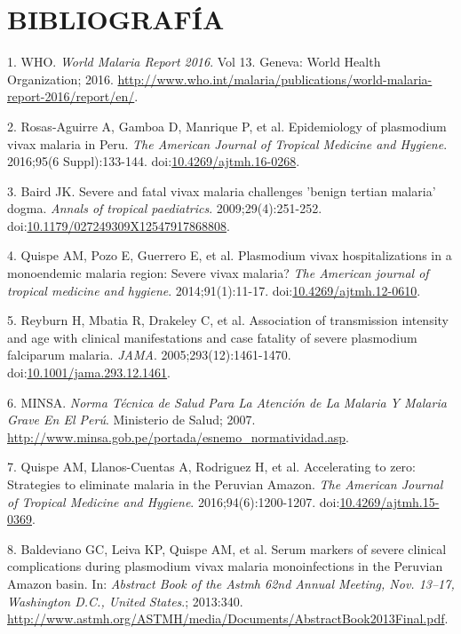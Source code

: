 \documentclass[a4paper]{article}
\begin{document}
\section{BIBLIOGRAFÍA}\label{bibliografia}

\hypertarget{refs}{}
\hypertarget{ref-WHO2016world}{}
1. WHO. \emph{World Malaria Report 2016}. Vol 13. Geneva: World Health
Organization; 2016.
\url{http://www.who.int/malaria/publications/world-malaria-report-2016/report/en/}.

\hypertarget{ref-rosas2016peru}{}
2. Rosas-Aguirre A, Gamboa D, Manrique P, et al. Epidemiology of
plasmodium vivax malaria in Peru. \emph{The American Journal of Tropical
Medicine and Hygiene}. 2016;95(6 Suppl):133-144.
doi:\href{https://doi.org/10.4269/ajtmh.16-0268}{10.4269/ajtmh.16-0268}.

\hypertarget{ref-baird2009}{}
3. Baird JK. Severe and fatal vivax malaria challenges 'benign tertian
malaria' dogma. \emph{Annals of tropical paediatrics}.
2009;29(4):251-252.
doi:\href{https://doi.org/10.1179/027249309X12547917868808}{10.1179/027249309X12547917868808}.

\hypertarget{ref-quispe2014}{}
4. Quispe AM, Pozo E, Guerrero E, et al. Plasmodium vivax
hospitalizations in a monoendemic malaria region: Severe vivax malaria?
\emph{The American journal of tropical medicine and hygiene}.
2014;91(1):11-17.
doi:\href{https://doi.org/10.4269/ajtmh.12-0610}{10.4269/ajtmh.12-0610}.

\hypertarget{ref-reyburn2015}{}
5. Reyburn H, Mbatia R, Drakeley C, et al. Association of transmission
intensity and age with clinical manifestations and case fatality of
severe plasmodium falciparum malaria. \emph{JAMA}.
2005;293(12):1461-1470.
doi:\href{https://doi.org/10.1001/jama.293.12.1461}{10.1001/jama.293.12.1461}.

\hypertarget{ref-norma2001}{}
6. MINSA. \emph{Norma Técnica de Salud Para La Atención de La Malaria Y
Malaria Grave En El Perú}. Ministerio de Salud; 2007.
\url{http://www.minsa.gob.pe/portada/esnemo_normatividad.asp}.

\hypertarget{ref-accelerate2016}{}
7. Quispe AM, Llanos-Cuentas A, Rodriguez H, et al. Accelerating to
zero: Strategies to eliminate malaria in the Peruvian Amazon. \emph{The
American Journal of Tropical Medicine and Hygiene}.
2016;94(6):1200-1207.
doi:\href{https://doi.org/10.4269/ajtmh.15-0369}{10.4269/ajtmh.15-0369}.

\hypertarget{ref-baldevi2013}{}
8. Baldeviano GC, Leiva KP, Quispe AM, et al. Serum markers of severe
clinical complications during plasmodium vivax malaria monoinfections in
the Peruvian Amazon basin. In: \emph{Abstract Book of the Astmh 62nd
Annual Meeting, Nov. 13--17, Washington D.C., United States}.; 2013:340.
\url{http://www.astmh.org/ASTMH/media/Documents/AbstractBook2013Final.pdf}.
\end{document}
